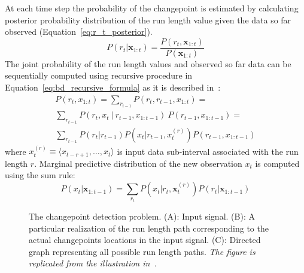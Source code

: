 At each time step the probability of the changepoint is estimated by calculating posterior probability distribution of the run length value given the data so far observed (Equation~\ref{eq:r_t_posterior}).
\begin{equation}
    P(r_t | \pmb{x}_{1:t}) = \frac{P(r_t, \pmb{x}_{1:t})}{P(\pmb{x}_{1:t})}
    \label{eq:r_t_posterior}
\end{equation}
The joint probability of the run length values and observed so far data
can be sequentially computed using recursive procedure in Equation~\ref{eq:bd_recursive_formula} as it is described in~\cite{mackay2007}:
\begin{multline}
    P(r_t, x_{1:t}) = \sum_{r_{t-1}} P(r_t, r_{t-1}, x_{1:t}) = \\
    \sum_{r_{t-1}} P(r_t, x_t \: | \: r_{t-1}, x_{1: t-1}) \: P(r_{t-1}, x_{1:t-1}) = \\
    \sum_{r_{t-1}} P(r_t | r_{t-1}) P(x_t | r_{t-1}, x_t^{(r)}) P(r_{t-1}, x_{1:t-1})
    \label{eq:bd_recursive_formula}
\end{multline}
where $x_t^{(r)} \equiv \langle x_{t-r+1},\dots,x_t \rangle$ is input data sub-interval associated with the run length $r$.
Marginal predictive distribution of the new observation $x_t$ is computed using the sum rule:
\begin{equation}
    P(x_{t} | \pmb{x}_{1:t-1}) = \sum_{r_t} P(x_{t}|r_{t}, \pmb{x}_t^{(r)}) P(r_t | \pmb{x}_{1:t-1})
    \label{eq:bd_marginal_predictive}
\end{equation}
%
\begin{figure}[htb!]
    
    \caption{
        The changepoint detection problem.
        (A): Input signal.
        (B): A particular realization of the run length path corresponding to the actual changepoints locations in the input signal.
        (C): Directed graph representing all possible run length paths.
        \textit{The figure is replicated from the illustration in~\cite{mackay2007}.}
        }
\label{fig:trellis_struct}
\end{figure}


